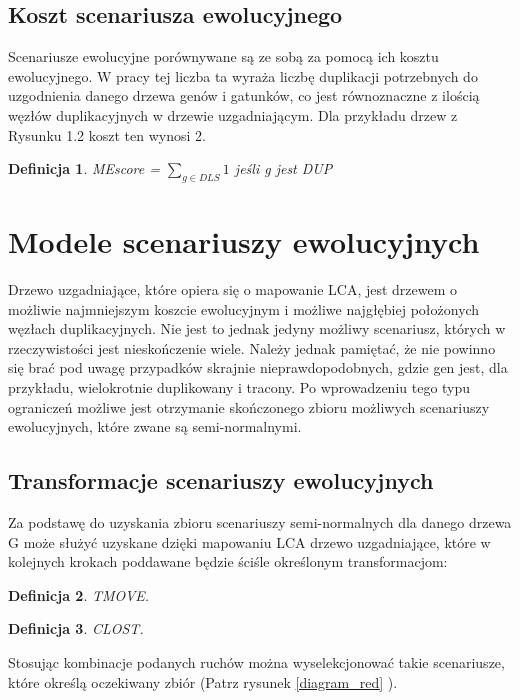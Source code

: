 \documentclass[licencjacka]{pracamgr}
\newtheorem{defi}{Definicja}[section]
\begin{document}
\subsection{Koszt scenariusza ewolucyjnego}

Scenariusze ewolucyjne porównywane są ze sobą za pomocą ich kosztu ewolucyjnego. W pracy tej liczba ta wyraża liczbę duplikacji potrzebnych do uzgodnienia danego drzewa genów i gatunków, co jest równoznaczne z ilością węzłów duplikacyjnych w drzewie uzgadniającym. Dla przykładu drzew z Rysunku 1.2 koszt ten wynosi 2.

\begin{defi}\label{ME}
  MEscore = $\sum_{g \in DLS} 1 $ jeśli g jest DUP 
\end{defi}



\section{Modele scenariuszy ewolucyjnych}

Drzewo uzgadniające, które opiera się o mapowanie LCA, jest drzewem o możliwie najmniejszym koszcie ewolucyjnym i możliwe najgłębiej położonych węzłach duplikacyjnych. Nie jest to jednak jedyny możliwy scenariusz, których w rzeczywistości jest nieskończenie wiele. Należy jednak pamiętać, że nie powinno się brać pod uwagę przypadków skrajnie nieprawdopodobnych, gdzie gen jest, dla przykładu, wielokrotnie duplikowany i tracony. Po wprowadzeniu tego typu ograniczeń możliwe jest otrzymanie skończonego zbioru możliwych scenariuszy ewolucyjnych, które zwane są semi-normalnymi. 

\subsection{Transformacje scenariuszy ewolucyjnych}

Za podstawę do uzyskania zbioru scenariuszy semi-normalnych dla danego drzewa G może służyć uzyskane dzięki mapowaniu LCA drzewo uzgadniające, które w kolejnych krokach poddawane będzie ściśle określonym transformacjom: 

\begin{defi}\label{TMOVE}
  TMOVE.
\end{defi}

\begin{defi}\label{CLOST}
  CLOST.
\end{defi}

Stosując kombinacje podanych ruchów można wyselekcjonować takie scenariusze, które określą oczekiwany zbiór (Patrz rysunek \ref{diagram_red} ).
\end{document}
